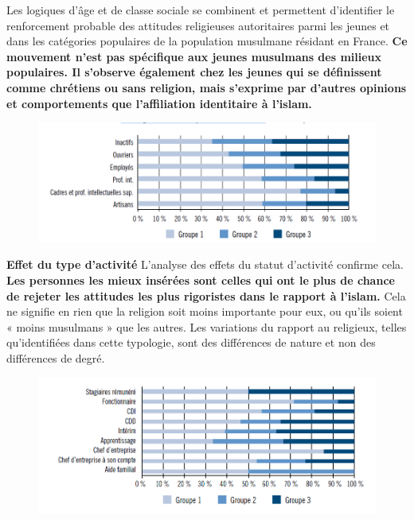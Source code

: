 Les logiques d'âge et de classe sociale se combinent et permettent
d'identifier le renforcement probable des attitudes religieuses
autoritaires parmi les jeunes et dans les catégories populaires de la
population musulmane résidant en France. \textbf{Ce mouvement n'est pas
spécifique aux jeunes musulmans des milieux populaires. Il s'observe
également chez les jeunes qui se définissent comme chrétiens ou sans
religion, mais s'exprime par d'autres opinions et comportements que
l'affiliation identitaire à l'islam.}

\begin{figure}
    \centering
    \includegraphics[width=\textwidth]{ImageIslamFrance/CSP.png}

    \label{fig:my_label}
\end{figure}




\textbf{Effet du type d'activité
} L'analyse des effets du statut d'activité confirme cela. \textbf{Les
personnes les mieux insérées sont celles qui ont le plus de chance de
rejeter les attitudes les plus rigoristes dans le rapport à l'islam.}
Cela ne signifie en rien que la religion soit moins importante pour eux,
ou qu'ils soient « moins musulmans » que les autres. Les variations du
rapport au religieux, telles qu'identifiées dans cette typologie, sont
des différences de nature et non des différences de degré.


\begin{figure}
    \centering
  
  \includegraphics[width=\textwidth]{ImageIslamFrance/activite.png}
    \label{fig:my_label}
\end{figure}







